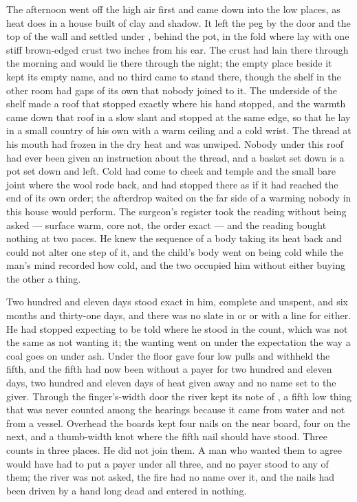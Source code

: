 The afternoon went off the high air first and came down into the low places, as heat does in a house built of clay and shadow. It left the peg by the door and the top of the wall and settled under , behind the pot, in the fold where  lay with one stiff brown-edged crust two inches from his ear. The crust had lain there through the morning and would lie there through the night; the empty place beside it kept its empty name, and no third came to stand there, though the shelf in the other room had gaps of its own that nobody joined to it. The underside of the shelf made a roof that stopped exactly where his hand stopped, and the warmth came down that roof in a slow slant and stopped at the same edge, so that he lay in a small country of his own with a warm ceiling and a cold wrist. The thread at his mouth had frozen in the dry heat and was unwiped. Nobody under this roof had ever been given an instruction about the thread, and a basket set down is a pot set down and left. Cold had come to cheek and temple and the small bare joint where the wool rode back, and had stopped there as if it had reached the end of its own order; the afterdrop waited on the far side of a warming nobody in this house would perform. The surgeon's register took the reading without being asked --- surface warm, core not, the order exact --- and the reading bought nothing at two paces. He knew the sequence of a body taking its heat back and could not alter one step of it, and the child's body went on being cold while the man's mind recorded how cold, and the two occupied him without either buying the other a thing.

Two hundred and eleven days stood exact in him, complete and unspent, and six months and thirty-one days, and there was no slate in  or  or  with a line for either. He had stopped expecting to be told where he stood in the count, which was not the same as not wanting it; the wanting went on under the expectation the way a coal goes on under ash. Under the floor  gave four low pulls and withheld the fifth, and the fifth had now been without a payer for two hundred and eleven days, two hundred and eleven days of heat given away and no name set to the giver. Through the finger's-width door the river kept its note of , a fifth low thing that was never counted among the hearings because it came from water and not from a vessel. Overhead the boards kept four nails on the near board, four on the next, and a thumb-width knot where the fifth nail should have stood. Three counts in three places. He did not join them. A man who wanted them to agree would have had to put a payer under all three, and no payer stood to any of them; the river was not asked, the fire had no name over it, and the nails had been driven by a hand long dead and entered in nothing.

